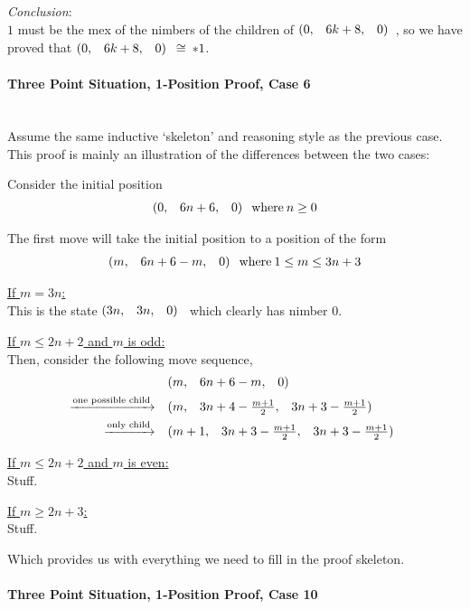 \documentclass{article}
\makeatletter
\newcommand{\game}[3]{\begin{array}{@{}*6r}(#1, & #2, & #3)\end{array}}
\newcommand{\gcong}{\cong\:}
\makeatother
\begin{document}
\bigskip
\textit{Conclusion}:\\
$1$ must be the mex of the nimbers of the children of $\game{0}{6k+8}{0}$,
so we have proved that $\game{0}{6k+8}{0} \gcong *1$.
\newpage

\paragraph{Three Point Situation, 1-Position Proof, Case 6} \\
Assume the same inductive `skeleton' and reasoning style as the previous case.
This proof is mainly an illustration of the differences between the two cases:

\bigskip
Consider the initial position
\begin{equation*}
  \game{0}{6n+6}{0} \: \text{where} \: n \geq 0
\end{equation*}

\medskip
The first move will take the initial position to a position of the form
\begin{equation*}
  \game{m}{6n+6-m}{0} \: \text{where} \: 1 \leq m \leq 3n+3
\end{equation*}

\bigskip
\underline{If $m = 3n$:} \\
This is the state $\game{3n}{3n}{0}$ which clearly has nimber $0$.

\bigskip
\underline{If $m \leq 2n + 2$ and $m$ is odd:} \\
Then, consider the following move sequence,
\begin{align*}
  & \game{m}{6n+6-m}{0} \\
  \xrightarrow{\text{one possible child}} \quad & 
  \game{m}{3n+4-\frac{m+1}{2}}{3n+3-\frac{m+1}{2}} \\
  \xrightarrow{\text{only child}} \quad & 
  \game{m+1}{3n+3-\frac{m+1}{2}}{3n+3-\frac{m+1}{2}} \\
\end{align*}

\bigskip
\underline{If $m \leq 2n + 2$ and $m$ is even:} \\
Stuff.

\bigskip
\underline{If $m \geq 2n + 3$:} \\
Stuff.

\bigskip
Which provides us with everything we need to fill in the proof
skeleton.
\paragraph{Three Point Situation, 1-Position Proof, Case 10}
\end{document}
